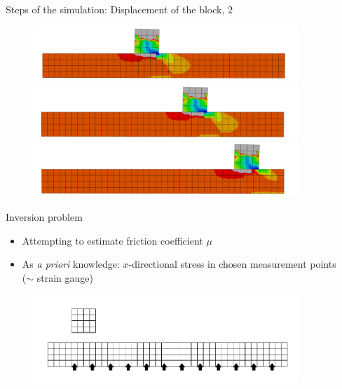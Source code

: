 \documentclass{beamer}
\begin{document}
\begin{frame}{Steps of the simulation: Displacement of the block, 2}

\begin{figure}
\includegraphics[width=10cm]{anim3.pdf}\\
\includegraphics[width=10cm]{anim4.pdf}\\
\includegraphics[width=10cm]{anim5.pdf}
\end{figure}

\end{frame}

\begin{frame}{Inversion problem}

\begin{itemize}
\item Attempting to estimate friction coefficient $\mu$
\item As \emph{a priori} knowledge: $x$-directional stress in chosen measurement points\\($\sim$ strain gauge)
\end{itemize}

\begin{figure}
\includegraphics[width=10cm]{fretting_geom_meas.pdf}
\end{figure}


\end{frame}
\end{document}
